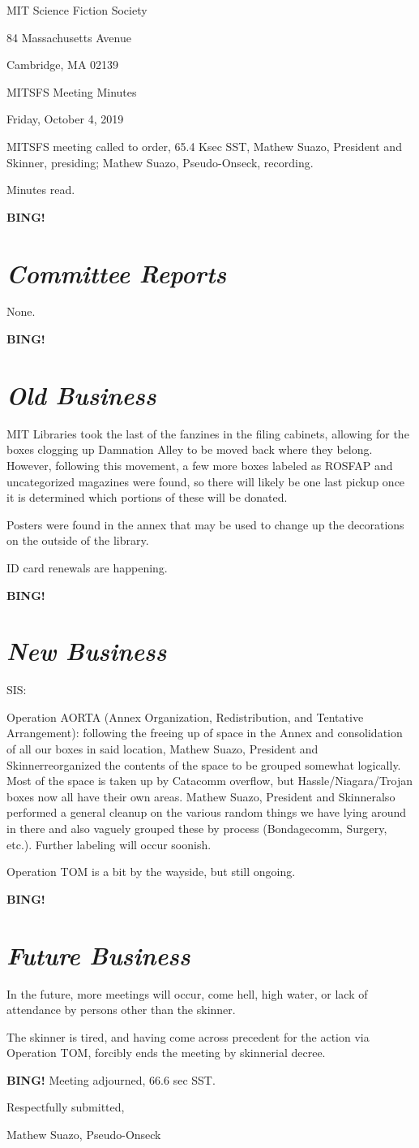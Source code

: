 \documentclass[10pt]{article}
\newcommand{\bing}{{\bf BING!} }
\newcommand{\goto}[1]{\bing \vskip 12pt \section*{{\em{#1}}}}
\newcommand{\skinner}{Mathew Suazo, President and Skinner}
\newcommand{\onseck}{Mathew Suazo, Pseudo-Onseck}
\newcommand{\meetingdate}{Friday, October 4, 2019 }
\begin{document}
\begin{center}

MIT Science Fiction Society

84 Massachusetts Avenue

Cambridge, MA 02139

\vspace{12pt}

MITSFS Meeting Minutes

\meetingdate

\end{center}

\vspace{18pt}

\setlength{\parskip}{6pt}

\noindent
MITSFS meeting called to order, 65.4 Ksec SST,
\skinner, presiding; \onseck, recording.

Minutes read.

\goto{Committee Reports}

None.

\goto{Old Business}

MIT Libraries took the last of the fanzines in the filing cabinets, allowing for the boxes clogging up Damnation Alley to be moved back where they belong. However, following this movement, a few more boxes labeled as ROSFAP and uncategorized magazines were found, so there will likely be one last pickup once it is determined which portions of these will be donated.

Posters were found in the annex that may be used to change up the decorations on the outside of the library.

ID card renewals are happening.

\goto{New Business}

SIS:

Operation AORTA (Annex Organization, Redistribution, and Tentative Arrangement): following the freeing up of space in the Annex and consolidation of all our boxes in said location, \skinner  reorganized the contents of the space to be grouped somewhat logically. Most of the space is taken up by Catacomm overflow, but Hassle/Niagara/Trojan boxes now all have their own areas. \skinner  also performed a general cleanup on the various random things we have lying around in there and also vaguely grouped these by process (Bondagecomm, Surgery, etc.). Further labeling will occur soonish.

Operation TOM is a bit by the wayside, but still ongoing.

\goto{Future Business}

In the future, more meetings will occur, come hell, high water, or lack of attendance by persons other than the skinner.

The skinner is tired, and having come across precedent for the action via Operation TOM, forcibly ends the meeting by skinnerial decree.

\bing
\noindent
Meeting adjourned, 66.6 sec SST.

\vspace{18pt}

\centerline{Respectfully submitted,}
\centerline{\onseck}
\end{document}
